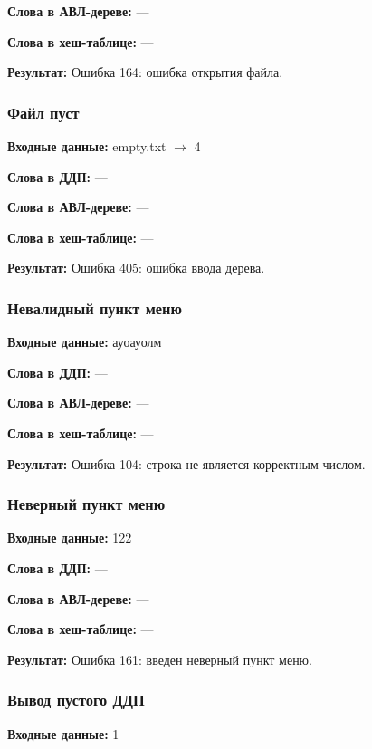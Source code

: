 \documentclass[a4paper,12pt]{extarticle}
\begin{document}
\textbf{Слова в АВЛ-дереве: }
---

\textbf{Слова в хеш-таблице: }
---

\textbf{Результат: }
Ошибка 164: ошибка открытия файла.


\subsubsection{Файл пуст}

\textbf{Входные данные: }
empty.txt $\rightarrow$ 4

\textbf{Слова в ДДП: }
---

\textbf{Слова в АВЛ-дереве: }
---

\textbf{Слова в хеш-таблице: }
---

\textbf{Результат: }
Ошибка 405: ошибка ввода дерева.


\subsubsection{Невалидный пункт меню}

\textbf{Входные данные: }
ауоауолм 

\textbf{Слова в ДДП: }
---

\textbf{Слова в АВЛ-дереве: }
---

\textbf{Слова в хеш-таблице: }
---

\textbf{Результат: }
Ошибка 104: строка не является корректным числом.


\subsubsection{Неверный пункт меню}

\textbf{Входные данные: }
122

\textbf{Слова в ДДП: }
---

\textbf{Слова в АВЛ-дереве: }
---

\textbf{Слова в хеш-таблице: }
---

\textbf{Результат: }
Ошибка 161: введен неверный пункт меню.


\subsubsection{Вывод пустого ДДП}

\textbf{Входные данные: }
1
\end{document}
